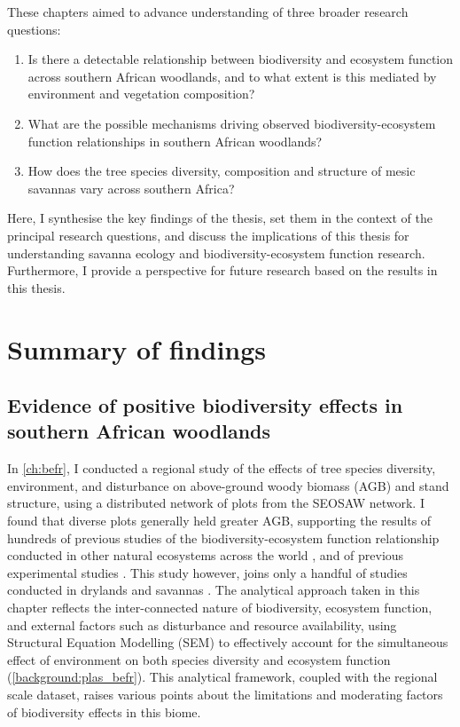 \begin{refsection}
These chapters aimed to advance understanding of three broader research questions:

\begin{enumerate}
\item{Is there a detectable relationship between biodiversity and ecosystem function across southern African woodlands, and to what extent is this mediated by environment and vegetation composition?}
\item{What are the possible mechanisms driving observed biodiversity-ecosystem function relationships in southern African woodlands?}
\item{How does the tree species diversity, composition and structure of mesic savannas vary across southern Africa?}
\end{enumerate}

Here, I synthesise the key findings of the thesis, set them in the context of the principal research questions, and discuss the implications of this thesis for understanding savanna ecology and biodiversity-ecosystem function research. Furthermore, I provide a perspective for future research based on the results in this thesis.

\section{Summary of findings}

\subsection{Evidence of positive biodiversity effects in southern African woodlands}

In \autoref{ch:befr}, I conducted a regional study of the effects of tree species diversity, environment, and disturbance on above-ground woody biomass (AGB) and stand structure, using a distributed network of plots from the SEOSAW network. I found that diverse plots generally held greater AGB, supporting the results of hundreds of previous studies of the biodiversity-ecosystem function relationship conducted in other natural ecosystems across the world \citep{Plas2019}, and of previous experimental studies \citep{Tilman2014}. This study however, joins only a handful of studies conducted in drylands and savannas \citep{Maestre2012, Grace2016, Plas2019, Clarke2017}. The analytical approach taken in this chapter reflects the inter-connected nature of biodiversity, ecosystem function, and external factors such as disturbance and resource availability, using Structural Equation Modelling (SEM) to effectively account for the simultaneous effect of environment on both species diversity and ecosystem function (\autoref{background:plas_befr}). This analytical framework, coupled with the regional scale dataset, raises various points about the limitations and moderating factors of biodiversity effects in this biome.


\end{refsection}
